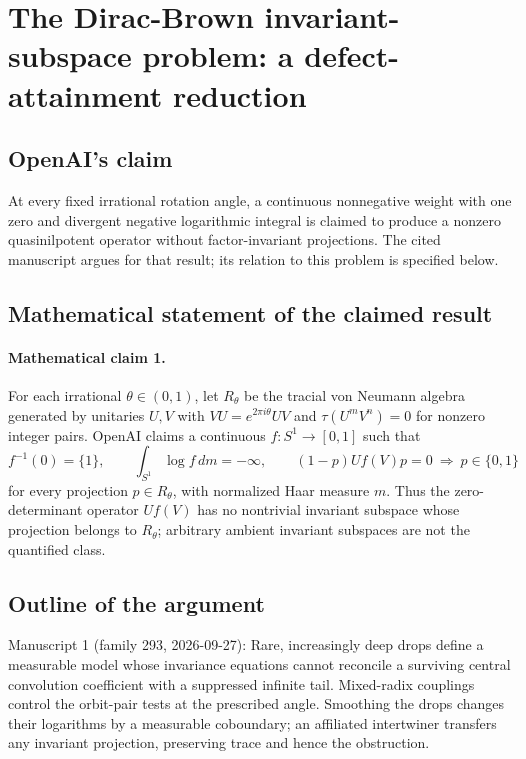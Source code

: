 \documentclass[11pt]{article}
\begin{document}
\section*{The Dirac-Brown invariant-subspace problem: a defect-attainment reduction}

\subsection{OpenAI's claim}
At every fixed irrational rotation angle, a continuous nonnegative weight with one zero and divergent negative logarithmic integral is claimed to produce a nonzero quasinilpotent operator without factor-invariant projections. The cited manuscript argues for that result; its relation to this problem is specified below.

\subsection{Mathematical statement of the claimed result}
\paragraph{Mathematical claim 1.} For each irrational $\theta\in(0,1)$, let $R_\theta$ be the tracial von Neumann algebra generated by unitaries $U,V$ with $VU=e^{2\pi i\theta}UV$ and $\tau(U^mV^n)=0$ for nonzero integer pairs. OpenAI claims a continuous $f:S^1\to[0,1]$ such that
\[
f^{-1}(0)=\{1\},\qquad\int_{S^1}\log f\,dm=-\infty,\qquad
(1-p)Uf(V)p=0\ \Longrightarrow\ p\in\{0,1\}
\]
for every projection $p\in R_\theta$, with normalized Haar measure $m$. Thus the zero-determinant operator $Uf(V)$ has no nontrivial invariant subspace whose projection belongs to $R_\theta$; arbitrary ambient invariant subspaces are not the quantified class.

\subsection{Outline of the argument}
Manuscript 1 (family 293, 2026-09-27): Rare, increasingly deep drops define a measurable model whose invariance equations cannot reconcile a surviving central convolution coefficient with a suppressed infinite tail. Mixed-radix couplings control the orbit-pair tests at the prescribed angle. Smoothing the drops changes their logarithms by a measurable coboundary; an affiliated intertwiner transfers any invariant projection, preserving trace and hence the obstruction.
\end{document}

